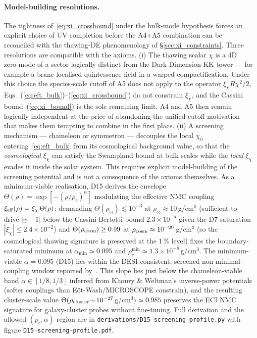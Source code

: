 \paragraph{Model-building resolutions.}
The tightness of~\eqref{eq:xi_crossbound} under the bulk-mode hypothesis
forces an explicit choice of UV completion before the A4+A5 combination
can be reconciled with the thawing-DE phenomenology of \S\ref{sec:xi_constraints}.
Three resolutions are compatible with the axioms.
(i) The thawing scalar $\chi$ is a 4D zero-mode of a sector logically
distinct from the Dark Dimension KK tower --- for example a brane-localised
quintessence field in a warped compactification. Under this choice the
species-scale cutoff of A5 does not apply to the operator $\xi_\chi R\chi^2/2$,
Eqs.~(\ref{eq:eft_bulk})--(\ref{eq:xi_crossbound}) do not constrain $\xi_\chi$,
and the Cassini bound~(\ref{eq:xi_bound}) is the sole remaining limit.
A4 and A5 then remain logically independent at the price of abandoning the
unified-cutoff motivation that makes them tempting to combine in the first place.
(ii) A screening mechanism --- chameleon or symmetron --- decouples the
local $\chi_0$ entering~\eqref{eq:eft_bulk} from its cosmological background
value, so that the \emph{cosmological} $\xi_\chi$ can satisfy the Swampland
bound at bulk scales while the \emph{local} $\xi_\chi$ evades it inside the
solar system. This requires explicit model-building of the screening
potential and is not a consequence of the axioms themselves.
As a minimum-viable realisation, D15 derives the envelope
$\Theta(\rho)=\exp[-(\rho/\rho_c)^{\alpha}]$ modulating the effective
NMC coupling $\xi_{\rm eff}(\rho)=\xi_\chi\,\Theta(\rho)$: demanding
$\Theta(\rho_\odot)\lesssim 10^{-3}$ at $\rho_\odot\approx 10\,$g/cm$^3$
(sufficient to drive $|\gamma-1|$ below the Cassini-Bertotti bound
$2.3\times 10^{-5}$ given the D7 saturation $|\xi_\chi|\le 2.4\times10^{-2}$)
and $\Theta(\rho_{\rm cosm})\ge 0.99$ at $\rho_{\rm cosm}\approx 10^{-29}\,$g/cm$^3$
(so the cosmological thawing signature is preserved at the $1\,\%$ level)
fixes the boundary-saturated minimum at $\alpha_{\min}\simeq 0.095$ and
$\rho_c^{\min}\simeq 1.3\times 10^{-8}\,$g/cm$^3$.
The minimum-viable $\alpha=0.095$ (D15) lies within the DESI-consistent,
screened non-minimal-coupling window reported by~\cite{AdamCline2025}. This slope lies just
below the chameleon-viable band $\alpha\in[1/8,1/3]$ inferred from
Khoury \& Weltman's inverse-power potentials \cite{KhouryWeltman2004}
(softer couplings than Eöt-Wash/MICROSCOPE constrain), and the resulting
cluster-scale value $\Theta(\rho_{\rm cluster}\!\sim\!10^{-27}\,$g/cm$^3)\simeq 0.985$
preserves the ECI NMC signature for galaxy-cluster probes without
fine-tuning. Full derivation and the allowed $(\rho_c,\alpha)$ region
are in \texttt{derivations/D15-screening-profile.py} with figure
\texttt{D15-screening-profile.pdf}.

